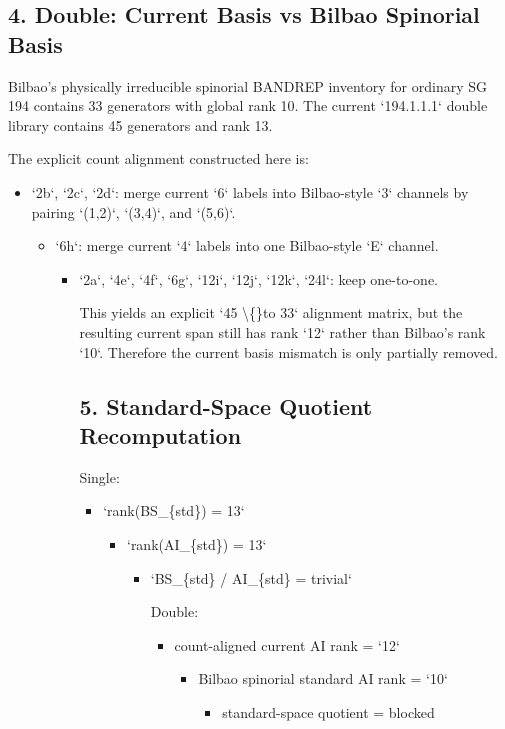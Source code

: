 \documentclass[11pt]{article}
\begin{document}
\begin{itemize}
\begin{itemize}
\begin{itemize}
\begin{itemize}
\begin{itemize}
\begin{itemize}
\subsection*{4. Double: Current Basis vs Bilbao Spinorial Basis}

Bilbao's physically irreducible spinorial BANDREP inventory for ordinary SG 194 contains 33 generators with global rank 10. The current `194.1.1.1` double library contains 45 generators and rank 13.

The explicit count alignment constructed here is:

\begin{itemize}
\item `2b`, `2c`, `2d`: merge current `6` labels into Bilbao-style `3` channels by pairing `(1,2)`, `(3,4)`, and `(5,6)`.
\begin{itemize}
\item `6h`: merge current `4` labels into one Bilbao-style `E` channel.
\begin{itemize}
\item `2a`, `4e`, `4f`, `6g`, `12i`, `12j`, `12k`, `24l`: keep one-to-one.

This yields an explicit `45 \textbackslash\{\}to 33` alignment matrix, but the resulting current span still has rank `12` rather than Bilbao's rank `10`. Therefore the current basis mismatch is only partially removed.

\subsection*{5. Standard-Space Quotient Recomputation}

Single:

\begin{itemize}
\item `rank(BS\_\{std\}) = 13`
\begin{itemize}
\item `rank(AI\_\{std\}) = 13`
\begin{itemize}
\item `BS\_\{std\} / AI\_\{std\} = trivial`

Double:

\begin{itemize}
\item count-aligned current AI rank = `12`
\begin{itemize}
\item Bilbao spinorial standard AI rank = `10`
\begin{itemize}
\item standard-space quotient = blocked


\end{itemize}
\end{itemize}
\end{itemize}
\end{itemize}
\end{itemize}
\end{itemize}
\end{itemize}
\end{itemize}
\end{itemize}
\end{itemize}
\end{itemize}
\end{itemize}
\end{itemize}
\end{itemize}
\end{itemize}
\end{document}
